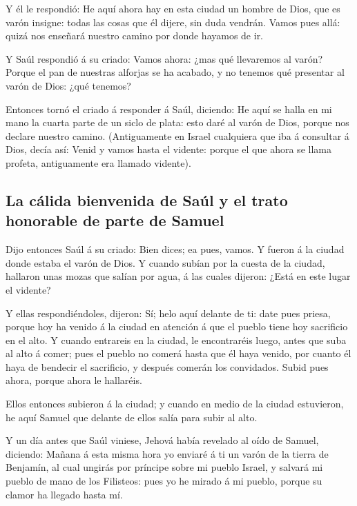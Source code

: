  Y él le respondió: He aquí ahora hay en esta ciudad un
hombre de Dios, que es varón insigne: todas las cosas que él dijere, sin
duda vendrán. Vamos pues allá: quizá nos enseñará nuestro camino por
donde hayamos de ir.

 Y Saúl respondió á su criado: Vamos ahora: ¿mas qué
llevaremos al varón? Porque el pan de nuestras alforjas se ha acabado, y
no tenemos qué presentar al varón de Dios: ¿qué tenemos?

 Entonces tornó el criado á responder á Saúl, diciendo: He
aquí se halla en mi mano la cuarta parte de un siclo de plata: esto daré
al varón de Dios, porque nos declare nuestro camino. 
(Antiguamente en Israel cualquiera que iba á consultar á Dios, decía
así: Venid y vamos hasta el vidente: porque el que ahora se llama
profeta, antiguamente era llamado vidente).

\hypertarget{la-cuxe1lida-bienvenida-de-sauxfal-y-el-trato-honorable-de-parte-de-samuel}{%
\subsection{La cálida bienvenida de Saúl y el trato honorable de parte
de
Samuel}\label{la-cuxe1lida-bienvenida-de-sauxfal-y-el-trato-honorable-de-parte-de-samuel}}

 Dijo entonces Saúl á su criado: Bien dices; ea pues,
vamos. Y fueron á la ciudad donde estaba el varón de Dios.
 Y cuando subían por la cuesta de la ciudad, hallaron
unas mozas que salían por agua, á las cuales dijeron: ¿Está en este
lugar el vidente?

 Y ellas respondiéndoles, dijeron: Sí; helo aquí delante
de ti: date pues priesa, porque hoy ha venido á la ciudad en atención á
que el pueblo tiene hoy sacrificio en el alto.  Y cuando
entrareis en la ciudad, le encontraréis luego, antes que suba al alto á
comer; pues el pueblo no comerá hasta que él haya venido, por cuanto él
haya de bendecir el sacrificio, y después comerán los convidados. Subid
pues ahora, porque ahora le hallaréis.

 Ellos entonces subieron á la ciudad; y cuando en medio
de la ciudad estuvieron, he aquí Samuel que delante de ellos salía para
subir al alto.

 Y un día antes que Saúl viniese, Jehová había revelado
al oído de Samuel, diciendo:  Mañana á esta misma hora yo
enviaré á ti un varón de la tierra de Benjamín, al cual ungirás por
príncipe sobre mi pueblo Israel, y salvará mi pueblo de mano de los
Filisteos: pues yo he mirado á mi pueblo, porque su clamor ha llegado
hasta mí.

